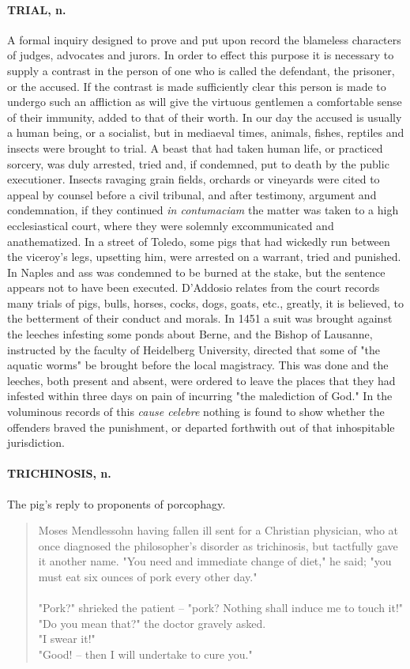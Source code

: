 \documentclass[11pt]{article}
\begin{document}
\paragraph{TRIAL, n.}  A formal inquiry designed to prove and put upon record the
blameless characters of judges, advocates and jurors.  In order to
effect this purpose it is necessary to supply a contrast in the person
of one who is called the defendant, the prisoner, or the accused.  If
the contrast is made sufficiently clear this person is made to undergo
such an affliction as will give the virtuous gentlemen a comfortable
sense of their immunity, added to that of their worth.  In our day the
accused is usually a human being, or a socialist, but in mediaeval
times, animals, fishes, reptiles and insects were brought to trial.  A
beast that had taken human life, or practiced sorcery, was duly
arrested, tried and, if condemned, put to death by the public
executioner.  Insects ravaging grain fields, orchards or vineyards
were cited to appeal by counsel before a civil tribunal, and after
testimony, argument and condemnation, if they continued {\em in
contumaciam} the matter was taken to a high ecclesiastical court,
where they were solemnly excommunicated and anathematized.  In a
street of Toledo, some pigs that had wickedly run between the
viceroy's legs, upsetting him, were arrested on a warrant, tried and
punished.  In Naples and ass was condemned to be burned at the stake,
but the sentence appears not to have been executed.  D'Addosio relates
from the court records many trials of pigs, bulls, horses, cocks,
dogs, goats, etc., greatly, it is believed, to the betterment of their
conduct and morals.  In 1451 a suit was brought against the leeches
infesting some ponds about Berne, and the Bishop of Lausanne,
instructed by the faculty of Heidelberg University, directed that some
of "the aquatic worms" be brought before the local magistracy.  This
was done and the leeches, both present and absent, were ordered to
leave the places that they had infested within three days on pain of
incurring "the malediction of God."  In the voluminous records of this
{\em cause celebre} nothing is found to show whether the offenders braved
the punishment, or departed forthwith out of that inhospitable
jurisdiction.

\paragraph{TRICHINOSIS, n.}  The pig's reply to proponents of porcophagy.
\begin{quote}   Moses Mendlessohn having fallen ill sent for a Christian
physician, who at once diagnosed the philosopher's disorder as 
trichinosis, but tactfully gave it another name.  "You need and
immediate change of diet," he said; "you must eat six ounces of pork
every other day." \\
  \\
   "Pork?" shrieked the patient -- "pork?  Nothing shall induce me to
touch it!" \\
  "Do you mean that?" the doctor gravely asked. \\
  "I swear it!" \\
  "Good! -- then I will undertake to cure you."
\end{quote}
\end{document}
